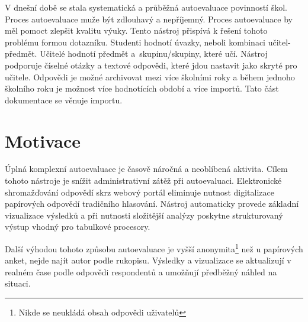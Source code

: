 V dnešní době se stala systematická a průběžná autoevaluace povinností škol.
Proces autoevaluace muže být zdlouhavý a nepříjemný. Proces autoevaluace by měl pomoct zlepšit kvalitu výuky.\cite{sbornik-autoevaluace} 
Tento nástroj přispívá k řešení tohoto problému formou dotazníku.
Studenti hodnotí úvazky, neboli kombinaci učitel-předmět. 
Učitelé hodnotí předmět a~skupinu/skupiny, které učí. 
Nástroj podporuje číselné otázky a textové odpovědi, které jdou nastavit jako skryté pro učitele.
Odpovědi je možné archivovat mezi více školními roky a během jednoho školního roku je možnost více hodnotících období a více importů.
Tato část dokumentace se věnuje importu.

\section{Motivace}
Úplná komplexní autoevaluace je časově náročná a neoblíbená aktivita.\cite{sbornik-autoevaluace}
Cílem tohoto nástroje je snížit administrativní zátěž při autoevaluaci.
Elektronické shromažďování odpovědí skrz webový portál eliminuje nutnost digitalizace papírových odpovědí tradičního hlasování. 
Nástroj automaticky provede základní vizualizace výsledků a při nutnosti složitější analýzy poskytne strukturovaný výstup vhodný pro tabulkové procesory.

Další výhodou tohoto způsobu autoevaluace je vyšší anonymita\footnote{Nikde se neukládá obsah odpovědi uživatelů} než u papírových anket, nejde najít autor podle rukopisu.  
Výsledky a vizualizace se aktualizují v realném čase podle odpovědi respondentů a umožňují předběžný náhled na situaci.
